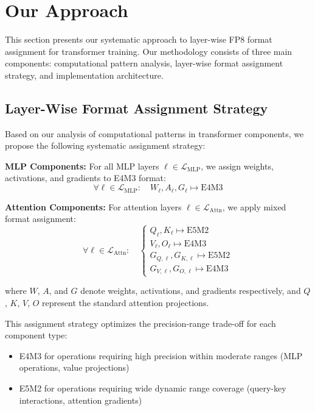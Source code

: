 \section{Our Approach}\label{sec:approach}

This section presents our systematic approach to layer-wise FP8 format assignment for transformer training. Our methodology consists of three main components: computational pattern analysis, layer-wise format assignment strategy, and implementation architecture.

\subsection{Layer-Wise Format Assignment Strategy}

Based on our analysis of computational patterns in transformer components, we propose the following systematic assignment strategy:

\textbf{MLP Components:}
For all MLP layers $\ell \in \mathcal{L}_{\mathrm{MLP}}$, we assign weights, activations, and gradients to E4M3 format:
\begin{equation}
\forall \ell \in \mathcal{L}_{\mathrm{MLP}}: \quad W_{\ell}, A_{\ell}, G_{\ell} \mapsto \text{E4M3}
\end{equation}

\textbf{Attention Components:}
For attention layers $\ell \in \mathcal{L}_{\mathrm{Attn}}$, we apply mixed format assignment:
\begin{equation}
\forall \ell \in \mathcal{L}_{\mathrm{Attn}}: \quad
\begin{cases}
Q_{\ell}, K_{\ell} \mapsto \text{E5M2} \\
V_{\ell}, O_{\ell} \mapsto \text{E4M3} \\
G_{Q,\ell}, G_{K,\ell} \mapsto \text{E5M2} \\
G_{V,\ell}, G_{O,\ell} \mapsto \text{E4M3}
\end{cases}
\end{equation}

where $W$, $A$, and $G$ denote weights, activations, and gradients respectively, and $Q$, $K$, $V$, $O$ represent the standard attention projections.

This assignment strategy optimizes the precision-range trade-off for each component type:
\begin{itemize}
\item E4M3 for operations requiring high precision within moderate ranges (MLP operations, value projections)
\item E5M2 for operations requiring wide dynamic range coverage (query-key interactions, attention gradients)
\end{itemize}

